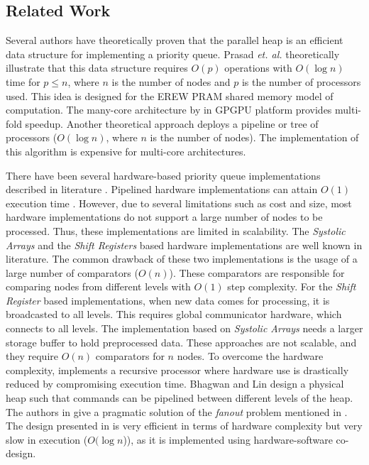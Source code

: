 \subsection{Related Work}
Several authors have theoretically proven that the parallel heap is an efficient data structure for implementing a priority queue.
Prasad {\it et. al.} \cite{pq3} theoretically illustrate that this data structure requires $O(p)$ operations with $O(\log n)$ time for $p \leq n$, where $n$ is the number of nodes and $p$ is the number of processors used.
This idea is designed for the EREW PRAM shared memory model of computation.
The many-core architecture by \cite{pq2} in GPGPU platform provides multi-fold speedup.
Another theoretical approach \cite{pq4} deploys a pipeline or tree of processors ($O(\log n)$, where $n$ is the number of nodes).
The implementation of this algorithm \cite{pq5} is expensive for multi-core architectures.

There have been several hardware-based priority queue implementations described in literature \cite{hw1,hw2,hw3,hw5,hw6,hw7,hw8,hw9}.
Pipelined hardware implementations can attain $O(1)$ execution time \cite{hw5,hw6}.
However, due to several limitations such as cost and size, most hardware implementations do not support a large number of nodes to be processed.
Thus, these implementations are limited in scalability.
The {\it Systolic Arrays} and the {\it Shift Registers} \cite{hw8,hw9} based hardware implementations are well known in literature.
The common drawback of these two implementations is the usage of a large number of comparators ($O(n)$).
These comparators are responsible for comparing nodes from different levels with $O(1)$ step complexity.
For the {\it Shift Register} \cite{hw9} based implementations, when new data comes for processing, it is broadcasted to all levels.
This requires global communicator hardware, which connects to all levels.
The implementation based on {\it Systolic Arrays} \cite{hw8} needs a larger storage buffer to hold preprocessed data.
These approaches are not scalable, and they require $O(n)$ comparators for $n$ nodes.
To overcome the hardware complexity, \cite{hw10} implements a recursive processor where hardware use is drastically reduced by compromising execution time.
Bhagwan and Lin \cite{hw2} design a physical heap such that commands can be pipelined between different levels of the heap.
The authors in \cite{hw1} give a pragmatic solution of the {\it fanout} problem mentioned in \cite{hw3}.
The design presented in \cite{hw11} is very efficient in terms of hardware complexity but very slow in execution ($O(\log n$)), as it is implemented using hardware-software co-design.

